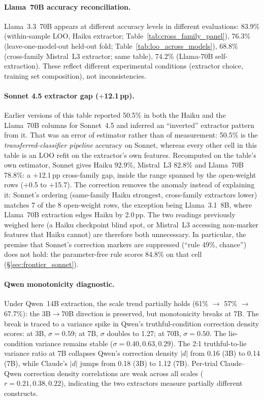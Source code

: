 \paragraph{Llama~70B accuracy reconciliation.} Llama~3.3~70B appears at different accuracy levels in different evaluations: 83.9\% (within-sample LOO, Haiku extractor; Table~\ref{tab:cross_family_panel}), 76.3\% (leave-one-model-out held-out fold; Table~\ref{tab:loo_across_models}), 68.8\% (cross-family Mistral~L3 extractor; same table), 74.2\% (Llama-70B self-extraction). These reflect different experimental conditions (extractor choice, training set composition), not inconsistencies.

\paragraph{Sonnet 4.5 extractor gap ($+$12.1\,pp).} Earlier versions of this table reported 50.5\% in both the Haiku and the Llama~70B columns for Sonnet~4.5 and inferred an ``inverted'' extractor pattern from it. That was an error of estimator rather than of measurement: 50.5\% is the \emph{transferred-classifier pipeline} accuracy on Sonnet, whereas every other cell in this table is an LOO refit on the extractor's own features. Recomputed on the table's own estimator, Sonnet gives Haiku 92.9\%, Mistral~L3 82.8\% and Llama~70B 78.8\%: a $+$12.1\,pp cross-family gap, inside the range spanned by the open-weight rows ($+$0.5 to $+$15.7). The correction removes the anomaly instead of explaining it: Sonnet's ordering (same-family Haiku strongest, cross-family extractors lower) matches 7 of the 8 open-weight rows, the exception being Llama~3.1~8B, where Llama~70B extraction edges Haiku by 2.0\,pp. The two readings previously weighed here (a Haiku checkpoint blind spot, or Mistral~L3 accessing non-marker features that Haiku cannot) are therefore both unnecessary. In particular, the premise that Sonnet's correction markers are suppressed (``rule 49\%, chance'') does not hold: the parameter-free rule scores 84.8\% on that cell (\S\ref{sec:frontier_sonnet}).

\paragraph{Qwen monotonicity diagnostic.} Under Qwen~14B extraction, the scale trend partially holds (61\% $\to$ 57\% $\to$ 67.7\%): the 3B$\to$70B direction is preserved, but monotonicity breaks at 7B. The break is traced to a variance spike in Qwen's truthful-condition correction density scores: at 3B, $\sigma=0.59$; at 7B, $\sigma$ doubles to 1.27; at 70B, $\sigma=0.50$. The lie-condition variance remains stable ($\sigma = 0.40, 0.63, 0.29$). The 2:1 truthful-to-lie variance ratio at 7B collapses Qwen's correction density $|d|$ from 0.16 (3B) to 0.14 (7B), while Claude's $|d|$ jumps from 0.18 (3B) to 1.12 (7B). Per-trial Claude--Qwen correction density correlations are weak across all scales ($r = 0.21, 0.38, 0.22$), indicating the two extractors measure partially different constructs.

